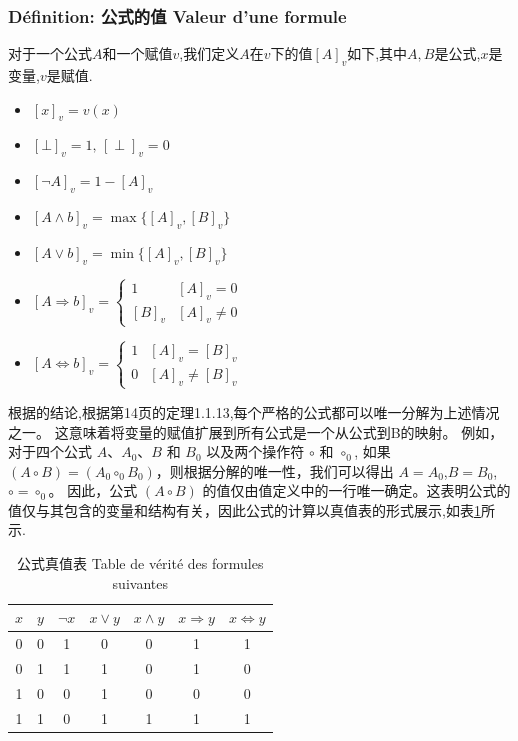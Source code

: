 \documentclass[12pt, a4paper, oneside]{ctexbook}
\begin{document}
  \subsubsection{Définition: 公式的值 Valeur d'une formule}
  对于一个公式$A$和一个赋值$v$,我们定义$A$在$v$下的值$[A]_v$如下,其中$A,B$是公式,$x$是变量,$v$是赋值.
  \begin{itemize}
    \item $[x]_v=v(x)$
    \item $[\bot]_v=1,\,[\perp]_v=0$
    \item $[\lnot A]_v=1-[A]_v$
    \item $[A\land b]_v=\max\{[A]_v,[B]_v \}$
    \item $[A\lor b]_v=\min\{[A]_v,[B]_v \}$
    \item $[A\Rightarrow b]_v=\begin{cases}
      1 & [A]_v=0\\
      [B]_v & [A]_v\neq 0
    \end{cases}$
    \item $[A\Leftrightarrow b]_v=\begin{cases}
      1 & [A]_v=[B]_v\\
      0 & [A]_v\neq [B]_v
    \end{cases}$
  \end{itemize}
  根据的结论,根据第14页的定理1.1.13,每个严格的公式都可以唯一分解为上述情况之一。
  这意味着将变量的赋值扩展到所有公式是一个从公式到B的映射。
  例如，对于四个公式 $A$、$A_0$、$B$ 和 $B_0$ 以及两个操作符 $\circ$ 和 $\circ_0$,
  如果 $(A\circ B)=(A_0\circ_0 B_0)$，则根据分解的唯一性，我们可以得出 $A=A_0$,$B=B_0$,$\circ=\circ_0$。
  因此，公式 $(A\circ B)$ 的值仅由值定义中的一行唯一确定。这表明公式的值仅与其包含的变量和结构有关，因此公式的计算以真值表的形式展示,如表\ref{tab:formes}所示.
  \begin{table}[ht]
    \centering
    \begin{tabular}{|c|c|c|c|c|c|c|}
      \hline
      $x$ & $y$ & $\neg x$ & $x\lor y$ & $x\land y$ & $x\Rightarrow y$ & $x\Leftrightarrow y$ \\\hline
      0 & 0 & 1 & 0 & 0 & 1 & 1 \\\hline
      0 & 1 & 1 & 1 & 0 & 1 & 0 \\\hline
      1 & 0 & 0 & 1 & 0 & 0 & 0 \\\hline
      1 & 1 & 0 & 1 & 1 & 1 & 1 \\
      \hline
    \end{tabular}
    \caption{公式真值表 Table de vérité des formules suivantes}
    \label{tab:formes}
  \end{table}
\end{document}
